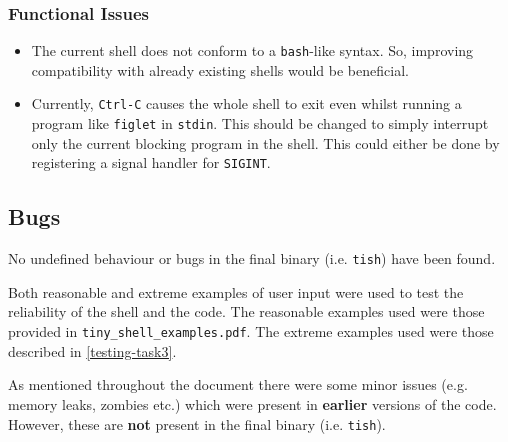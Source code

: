 \documentclass[12pt]{article}
\begin{document}
\subsubsection{Functional Issues}

\begin{itemize}
\item
  The current shell does not conform to a \texttt{bash}-like
  syntax. So, improving compatibility with already existing
  shells would be beneficial.
\item
  Currently, \texttt{Ctrl-C} causes the whole shell to exit even
  whilst running a program like \texttt{figlet} in
  \texttt{stdin}. This should be changed to simply interrupt
  only the current blocking program in the shell. This could
  either be done by registering a signal handler for
  \texttt{SIGINT}.
\end{itemize}

\subsection{Bugs}

No undefined behaviour or bugs in the final binary (i.e.
\texttt{tish}) have been found.

Both reasonable and extreme examples of user input were used to
test the reliability of the shell and the code. The reasonable
examples used were those provided in
\texttt{tiny\_shell\_examples.pdf}. The extreme examples used
were those described in \ref{testing-task3}.

As mentioned throughout the document there were some minor
issues (e.g. memory leaks, zombies etc.) which were present in
\textbf{earlier} versions of the code. However, these are
\textbf{not} present in the final binary (i.e. \texttt{tish}).
\end{document}
